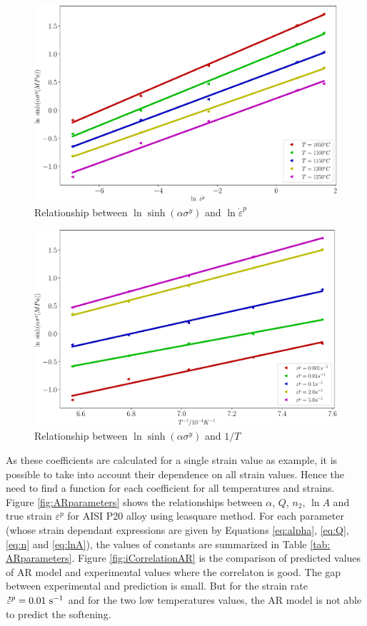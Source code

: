 \documentclass[twoside,english,1p,final,sort&compress]{elsarticle}
\theoremstyle{plain}
\newcommand{\mdot}[1]{\accentset{\mbox{\bfseries .}}{#1}}
\begin{document}
\begin{figure}[!ht]
\centering
\includegraphics[width=0.9\columnwidth]{Figures/LnSinhE}
\caption{Relationship between $\ln \sinh(\alpha\sigma^y) $ and $\ln \dot{\varepsilon}^p$}
\label{fig:LnSinhE}
\end{figure}
\begin{figure}[!ht]
\centering
\includegraphics[width=0.9\columnwidth]{Figures/LnSinhT}
\caption{Relationship between $\ln \sinh(\alpha\sigma^y) $ and $1/T$}
\label{fig:LnSinhT}
\end{figure}
As these coefficients are calculated for a single strain value as example, it is possible to take into account their dependence on all strain values. Hence the need to find a function for each coefficient for all temperatures and strains. Figure  \ref{fig:ARparameters} shows the relationships between $\alpha$, $Q$, $n_2$, $\ln A$ and true strain $\varepsilon^p$ for AISI P20 alloy using leasquare method. For each parameter (whose strain dependant expressions are given by Equations \ref{eq:alpha}, \ref{eq:Q}, \ref{eq:n} and \ref{eq:lnA}), the values of constants are summarized in Table \ref{tab: ARparameters}. Figure \ref{fig:iCorrelationAR} is the comparison of predicted values of AR model and experimental values where the correlaton is good. The gap between experimental and prediction is small. But for the strain rate $\mdot\varepsilon^p = 0.01\ \text{s}^{-1}$ and for the two low temperatures values, the AR model is not able to predict the softening.
\end{document}

